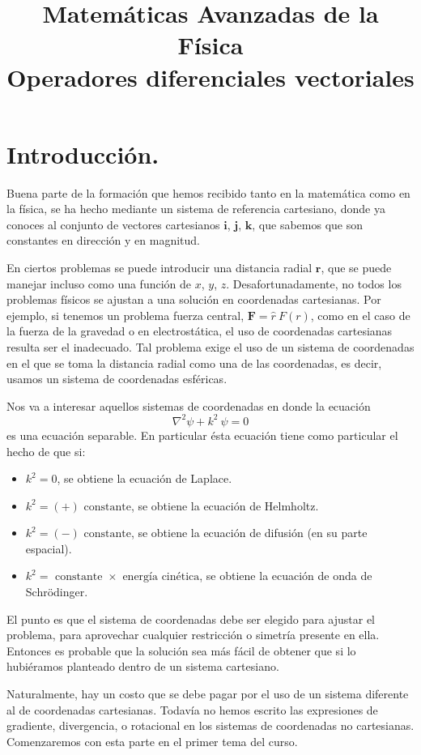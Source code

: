 
\title{Matemáticas Avanzadas de la Física \\ {\large Operadores diferenciales vectoriales}}
\date{ }

\renewcommand\labelenumii{\theenumi.{\arabic{enumii}}}
\maketitle
\fontsize{14}{14}\selectfont
\section{Introducción.}
Buena parte de la formación que hemos recibido tanto en la matemática como en la física, se ha hecho mediante un sistema de referencia cartesiano, donde ya conoces al conjunto de vectores cartesianos $\mathbf{i}$, $\mathbf{j}$, $\mathbf{k}$, que sabemos que son constantes en dirección y en magnitud. 
\par
En ciertos problemas se puede introducir una distancia radial $\mathbf{r}$, que se puede manejar incluso como una función de $x$, $y$, $z$. Desafortunadamente, no todos los problemas físicos se ajustan a una solución en coordenadas cartesianas. Por ejemplo, si tenemos un problema fuerza central, $\mathbf{F} = \widehat{r} \: F(r)$, como en el caso de la fuerza de la gravedad o en electrostática, el uso de coordenadas cartesianas resulta ser el inadecuado. Tal problema exige el uso de un sistema de coordenadas en el que se toma la distancia radial como una de las coordenadas, es decir, usamos un sistema de coordenadas esféricas.
\par
Nos va a interesar aquellos sistemas de coordenadas en donde la ecuación
\[ \nabla^{2} \psi + k^{2} \: \psi =0 \]
es una ecuación separable.  En particular ésta ecuación tiene como particular el hecho de que si:
\begin{itemize}
\item $k^{2} = 0$, se obtiene la ecuación de Laplace.
\item $k^{2} = (+) \mbox{ constante}$, se obtiene la ecuación de Helmholtz.
\item $k^{2} = (-) \mbox{ constante}$, se obtiene la ecuación de difusión (en su parte espacial).
\item $k^{2} = \mbox{ constante } \times \mbox{ energía cinética}$, se obtiene la ecuación de onda de Schrödinger.
\end{itemize}
\par
El punto es que el sistema de coordenadas debe ser elegido para ajustar el problema, para aprovechar cualquier restricción o simetría presente en ella. Entonces es probable que la solución sea más fácil de obtener que si lo hubiéramos planteado dentro de un sistema cartesiano.
\par
Naturalmente, hay un costo que se debe pagar por el uso de un sistema diferente al de coordenadas cartesianas. Todavía no hemos escrito las expresiones de gradiente, divergencia, o rotacional en los sistemas de coordenadas no cartesianas. Comenzaremos con esta parte en el primer tema del curso.
